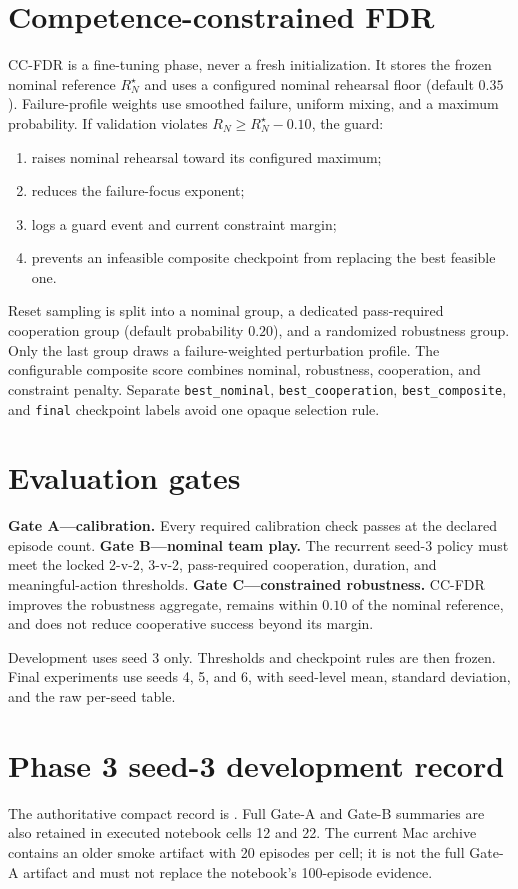 \documentclass[12pt,twocolumn]{article}
\begin{document}
\section{Competence-constrained FDR}
CC-FDR is a fine-tuning phase, never a fresh initialization. It stores the frozen nominal reference
$R_N^\star$ and uses a configured nominal rehearsal floor (default $0.35$). Failure-profile weights
use smoothed failure, uniform mixing, and a maximum probability. If validation violates
$R_N\geq R_N^\star-0.10$, the guard:
\begin{enumerate}
\item raises nominal rehearsal toward its configured maximum;
\item reduces the failure-focus exponent;
\item logs a guard event and current constraint margin;
\item prevents an infeasible composite checkpoint from replacing the best feasible one.
\end{enumerate}
Reset sampling is split into a nominal group, a dedicated pass-required cooperation group
(default probability $0.20$), and a randomized robustness group. Only the last group draws a
failure-weighted perturbation profile.
The configurable composite score combines nominal, robustness, cooperation, and constraint
penalty. Separate \texttt{best\_nominal}, \texttt{best\_cooperation},
\texttt{best\_composite}, and \texttt{final} checkpoint labels avoid one opaque selection rule.

\section{Evaluation gates}
\textbf{Gate A---calibration.} Every required calibration check passes at the declared episode
count. \textbf{Gate B---nominal team play.} The recurrent seed-3 policy must meet the locked
2-v-2, 3-v-2, pass-required cooperation, duration, and meaningful-action thresholds.
\textbf{Gate C---constrained
robustness.} CC-FDR improves the robustness aggregate, remains within $0.10$ of the nominal
reference, and does not reduce cooperative success beyond its margin.

Development uses seed 3 only. Thresholds and checkpoint rules are then frozen. Final experiments
use seeds 4, 5, and 6, with seed-level mean, standard deviation, and the raw per-seed table.

\section{Phase 3 seed-3 development record}
The authoritative compact record is
. Full Gate-A and Gate-B summaries are also retained
in executed notebook cells 12 and 22. The current Mac archive contains an older
 smoke artifact with 20 episodes per cell; it is not the full Gate-A
artifact and must not replace the notebook's 100-episode evidence.
\end{document}
